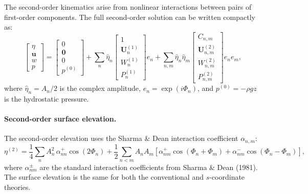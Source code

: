 The second-order kinematics arise from nonlinear interactions between pairs of first-order components. The full second-order solution can be written compactly as:
\begin{equation}\label{eq:2nd_order}
    \begin{bmatrix} \eta \\ \mathbf{u} \\ w \\ p \end{bmatrix} =
    \begin{bmatrix} 0 \\ \mathbf{0} \\ 0 \\ p^{(0)} \end{bmatrix}
    + \sum_{n} \hat{\eta}_n
    \begin{bmatrix} 1 \\ \mathbf{U}_n^{(1)} \\ W_n^{(1)} \\ P_n^{(1)} \end{bmatrix} e_n
    + \sum_{n,m} \hat{\eta}_n \hat{\eta}_m
    \begin{bmatrix} C_{n,m} \\ \mathbf{U}_{n,m}^{(2)} \\ W_{n,m}^{(2)} \\ P_{n,m}^{(2)} \end{bmatrix} e_n e_m,
\end{equation}
where $\hat{\eta}_n = A_n/2$ is the complex amplitude, $e_n = \exp(i\Phi_n)$, and $p^{(0)} = -\rho g z$ is the hydrostatic pressure.

\paragraph{Second-order surface elevation.}
The second-order elevation uses the Sharma \& Dean interaction coefficient $\alpha_{n,m}$:
\begin{equation}
    \eta^{(2)} = \frac{1}{4}\sum_n A_n^2\, \alpha_{nn}^+ \cos(2\Phi_n)
    + \frac{1}{2}\sum_{n<m} A_n A_m \left[\alpha_{nm}^+ \cos(\Phi_n + \Phi_m) + \alpha_{nm}^- \cos(\Phi_n - \Phi_m)\right],
\end{equation}
where $\alpha_{nm}^\pm$ are the standard interaction coefficients from Sharma \& Dean (1981). The surface elevation is the same for both the conventional and $s$-coordinate theories.

